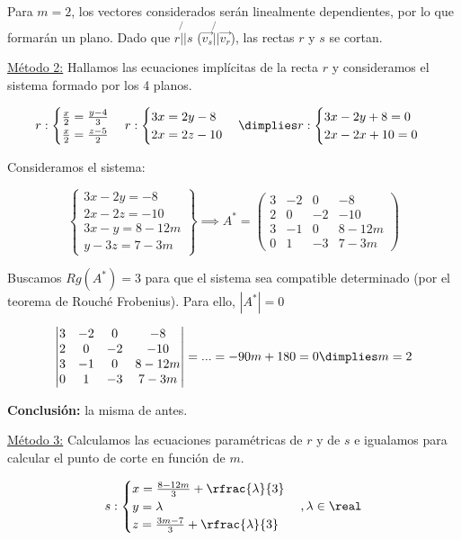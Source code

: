 \documentclass[palatino,nosec,nochap,nobuilddate]{Docencia}
\renewcommand{\vec}[1]{\overrightarrow{#1}}
\begin{document}
\begin{problem}
\begin{itemize}
Para $m=2$, los vectores considerados serán linealmente dependientes, por lo que formarán un plano. Dado que $r\not{||}s$ ($\vec{v_s}\not{||}\vec{v_r}$), las rectas $r$ y $s$ se cortan.

\end{itemize}

\ul{Método 2:} Hallamos las ecuaciones implícitas de la recta $r$ y consideramos el sistema formado por los 4 planos.

\[
r: \begin{cases} \frac{x}{2} = \frac{y-4}{3}\\\frac{x}{2} = \frac{z-5}{2}\end{cases}r:\begin{cases}3x = 2y-8 \\ 2x = 2z-10\end{cases} \dimplies r:\begin{cases}3x-2y+8=0\\2x-2x+10=0\end{cases}
\]

Consideramos el sistema: 

\[
\left\{\begin{array}{c}
3x-2y=-8\\
2x-2z=-10\\
3x-y=8-12m\\
y-3z = 7-3m
\end{array}
\right\} \implies A^* = \begin{pmatrix}
3&-2&0&-8\\
2&0&-2&-10\\
3&-1&0&8-12m\\
0&1&-3&7-3m
\end{pmatrix}
\]

Buscamos $Rg(A^*) = 3$ para que el sistema sea compatible determinado (por el teorema de Rouché Frobenius). Para ello, $|A^*| = 0$

\[
\left|\begin{matrix}
	3&-2&0&-8\\
	2&0&-2&-10\\
	3&-1&0&8-12m\\
	0&1&-3&7-3m
\end{matrix}\right| = ... = -90m+180 = 0 \dimplies m=2
\]

\textbf{Conclusión:} la misma de antes.

\ul{Método 3:} Calculamos las ecuaciones paramétricas de $r$ y de $s$ e igualamos para calcular el punto de corte en función de $m$.

\[
	s: \begin{cases}
	x = \frac{8-12m}{3} + \rfrac{\lambda}{3}\\
	y = \lambda \\
	z = \frac{3m-7}{3} + \rfrac{\lambda}{3}
	\end{cases}, \lambda\in\real
\]


\end{problem}
\end{document}

